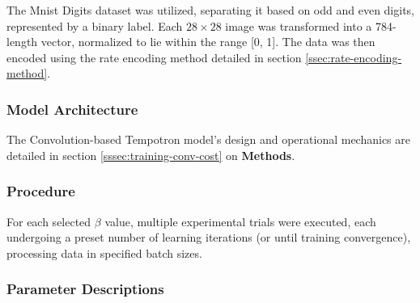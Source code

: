 The Mnist Digits dataset was utilized, separating it based on odd and even digits, represented by a binary label. Each $28 \times 28$ image was transformed into a 784-length vector, normalized to lie within the range [0, 1]. The data was then encoded using the rate encoding method detailed in section \ref{ssec:rate-encoding-method}.


\subsubsection{Model Architecture}

The Convolution-based Tempotron model's design and operational mechanics are detailed in section \ref{sssec:training-conv-cost} on \textbf{Methods}.


\subsubsection{Procedure}

For each selected $\beta$ value, multiple experimental trials were executed, each undergoing a preset number of learning iterations (or until training convergence), processing data in specified batch sizes.

\subsubsection{Parameter Descriptions}

